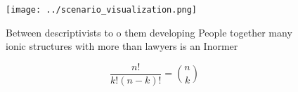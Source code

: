 \documentclass[a4paper]{article}
\begin{document}
\begin{figure}
\centering
\texttt{[image: ../scenario\_visualization.png]}
\caption{Between descriptivists to o them developing People together many ionic structures with more than lawyers is an Inormer 
}
\end{figure}
 
\[ \frac{n!}{k!(n-k)!} = \binom{n}{k} \]
\end{document}
